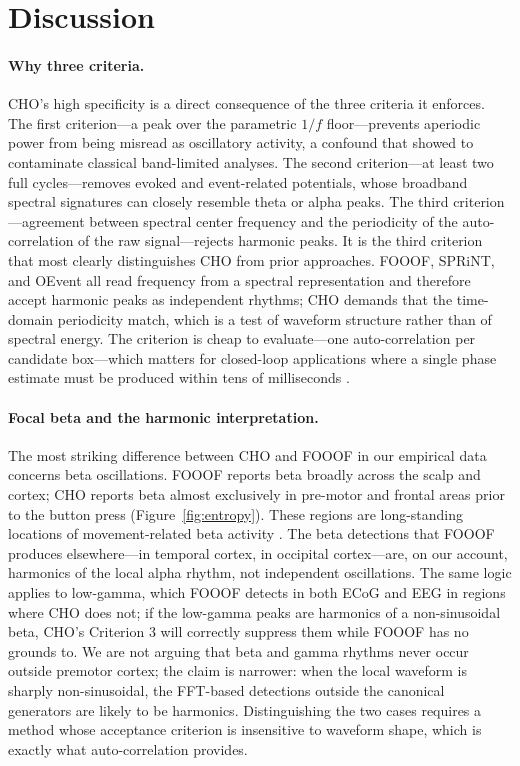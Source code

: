 \documentclass[11pt]{article}
\begin{document}
\section{Discussion}

\paragraph{Why three criteria.}
CHO's high specificity is a direct consequence of the three criteria it enforces. The first criterion---a peak over the parametric $1/f$ floor---prevents aperiodic power from being misread as oscillatory activity, a confound that \citet{donoghue2020parameterizing} showed to contaminate classical band-limited analyses. The second criterion---at least two full cycles---removes evoked and event-related potentials, whose broadband spectral signatures can closely resemble theta or alpha peaks. The third criterion---agreement between spectral center frequency and the periodicity of the auto-correlation of the raw signal---rejects harmonic peaks. It is the third criterion that most clearly distinguishes CHO from prior approaches. FOOOF, SPRiNT, and OEvent all read frequency from a spectral representation and therefore accept harmonic peaks as independent rhythms; CHO demands that the time-domain periodicity match, which is a test of waveform structure rather than of spectral energy. The criterion is cheap to evaluate---one auto-correlation per candidate box---which matters for closed-loop applications where a single phase estimate must be produced within tens of milliseconds \citep{cagnan2017phase,schalk2004bci2000}.

\paragraph{Focal beta and the harmonic interpretation.}
The most striking difference between CHO and FOOOF in our empirical data concerns beta oscillations. FOOOF reports beta broadly across the scalp and cortex; CHO reports beta almost exclusively in pre-motor and frontal areas prior to the button press (Figure~\ref{fig:entropy}). These regions are long-standing locations of movement-related beta activity \citep{pfurtscheller1999eventrelated,jenkinson2011new}. The beta detections that FOOOF produces elsewhere---in temporal cortex, in occipital cortex---are, on our account, harmonics of the local alpha rhythm, not independent oscillations. The same logic applies to low-gamma, which FOOOF detects in both ECoG and EEG in regions where CHO does not; if the low-gamma peaks are harmonics of a non-sinusoidal beta, CHO's Criterion 3 will correctly suppress them while FOOOF has no grounds to. We are not arguing that beta and gamma rhythms never occur outside premotor cortex; the claim is narrower: when the local waveform is sharply non-sinusoidal, the FFT-based detections outside the canonical generators are likely to be harmonics. Distinguishing the two cases requires a method whose acceptance criterion is insensitive to waveform shape, which is exactly what auto-correlation provides.
\end{document}

